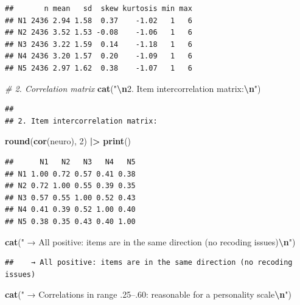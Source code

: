 \documentclass[
]{article}
\newenvironment{Shaded}{\begin{snugshade}}{\end{snugshade}}
\newcommand{\CommentTok}[1]{\textcolor[rgb]{0.56,0.35,0.01}{\textit{#1}}}
\newcommand{\DecValTok}[1]{\textcolor[rgb]{0.00,0.00,0.81}{#1}}
\newcommand{\FunctionTok}[1]{\textcolor[rgb]{0.13,0.29,0.53}{\textbf{#1}}}
\newcommand{\NormalTok}[1]{#1}
\newcommand{\SpecialCharTok}[1]{\textcolor[rgb]{0.81,0.36,0.00}{\textbf{#1}}}
\newcommand{\StringTok}[1]{\textcolor[rgb]{0.31,0.60,0.02}{#1}}
\begin{document}
\begin{verbatim}
##       n mean   sd  skew kurtosis min max
## N1 2436 2.94 1.58  0.37    -1.02   1   6
## N2 2436 3.52 1.53 -0.08    -1.06   1   6
## N3 2436 3.22 1.59  0.14    -1.18   1   6
## N4 2436 3.20 1.57  0.20    -1.09   1   6
## N5 2436 2.97 1.62  0.38    -1.07   1   6
\end{verbatim}

\begin{Shaded}
\begin{Highlighting}[]
\CommentTok{\# 2. Correlation matrix}
\FunctionTok{cat}\NormalTok{(}\StringTok{"}\SpecialCharTok{\textbackslash{}n}\StringTok{2. Item intercorrelation matrix:}\SpecialCharTok{\textbackslash{}n}\StringTok{"}\NormalTok{)}
\end{Highlighting}
\end{Shaded}

\begin{verbatim}
## 
## 2. Item intercorrelation matrix:
\end{verbatim}

\begin{Shaded}
\begin{Highlighting}[]
\FunctionTok{round}\NormalTok{(}\FunctionTok{cor}\NormalTok{(neuro), }\DecValTok{2}\NormalTok{) }\SpecialCharTok{|\textgreater{}} \FunctionTok{print}\NormalTok{()}
\end{Highlighting}
\end{Shaded}

\begin{verbatim}
##      N1   N2   N3   N4   N5
## N1 1.00 0.72 0.57 0.41 0.38
## N2 0.72 1.00 0.55 0.39 0.35
## N3 0.57 0.55 1.00 0.52 0.43
## N4 0.41 0.39 0.52 1.00 0.40
## N5 0.38 0.35 0.43 0.40 1.00
\end{verbatim}

\begin{Shaded}
\begin{Highlighting}[]
\FunctionTok{cat}\NormalTok{(}\StringTok{"   → All positive: items are in the same direction (no recoding issues)}\SpecialCharTok{\textbackslash{}n}\StringTok{"}\NormalTok{)}
\end{Highlighting}
\end{Shaded}

\begin{verbatim}
##    → All positive: items are in the same direction (no recoding issues)
\end{verbatim}

\begin{Shaded}
\begin{Highlighting}[]
\FunctionTok{cat}\NormalTok{(}\StringTok{"   → Correlations in range .25–.60: reasonable for a personality scale}\SpecialCharTok{\textbackslash{}n}\StringTok{"}\NormalTok{)}
\end{Highlighting}
\end{Shaded}
\end{document}
